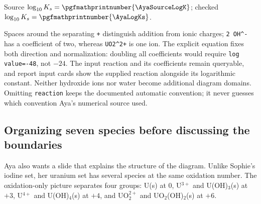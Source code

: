 \documentclass[a4paper,11pt]{ltxdoc}
\begin{document}
\begin{codeexample}[width=0pt]
\AyaReactionHandle
{}
\begin{minipage}{11cm}
Source $\log_{10}K_s=\pgfmathprintnumber{\AyaSourceLogK}$;
checked $\log_{10}K_s=\pgfmathprintnumber{\AyaLogKs}$.
\par
{}
\end{minipage}
\end{codeexample}

Spaces around the separating \texttt{+} distinguish addition from ionic charges;
\verb|2 OH^-| has a coefficient of two, whereas \verb|UO2^2+| is one ion.
The explicit equation fixes both direction and normalization: doubling all
coefficients would require \texttt{log value=-48}, not $-24$.
The input reaction and its coefficients remain queryable, and report input cards
show the supplied reaction alongside its logarithmic constant. Neither hydroxide
ions nor water become additional diagram domains. Omitting \texttt{reaction}
keeps the documented automatic convention; it never guesses which convention
Aya's numerical source used.

\subsection{Organizing seven species before discussing the boundaries}
Aya also wants a slide that explains the structure of the diagram. Unlike
Sophie's iodine set, her uranium set has several species at the same oxidation
number. The oxidation-only picture separates four groups: U(s) at 0,
U$^{3+}$ and U(OH)$_3$(s) at $+3$, U$^{4+}$ and U(OH)$_4$(s) at $+4$, and
UO$_2^{2+}$ and UO$_2$(OH)$_2$(s) at $+6$.
\end{document}
